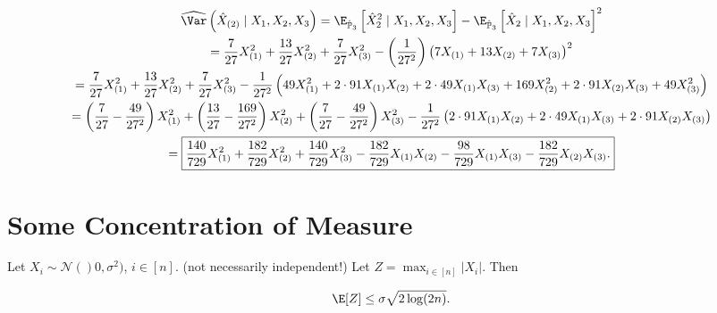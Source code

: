 \begin{solution}
\begin{enumerate}[(a)]
\begin{multline*}
\widehat{\Var} \left(\hat{X}_{(2)}  \mid X_1, X_2, X_3 \right)   = \E_{\hat{\mathbb{P}}_3} \left[ \hat{X}_2^2   \mid X_1, X_2, X_3 \right] - \E_{\hat{\mathbb{P}}_3} \left[ \hat{X}_2   \mid X_1, X_2, X_3 \right] ^2
\\ =  \frac{7}{27} X_{(1)}^2 + \frac{13}{27} X_{(2)}^2 + \frac{7}{27} X_{(3)}^2 - \left(\frac{1}{27^2} \right) \left( 7 X_{(1)} + 13 X_{(2)} +7 X_{(3)}\right)^2
\\ =  \frac{7}{27} X_{(1)}^2 + \frac{13}{27} X_{(2)}^2 + \frac{7}{27} X_{(3)}^2 - \frac{1}{27^2}  \left( 49 X_{(1)}^2 + 2 \cdot 91  X_{(1)}X_{(2)} + 2 \cdot 49 X_{(1)} X_{(3)}+ 169 X_{(2)}^2 +2 \cdot 91 X_{(2)} X_{(3)} + 49 X_{(3)}^2\right)
\\ =  \left( \frac{7}{27} - \frac{49}{27^2}  \right) X_{(1)}^2 + \left( \frac{13}{27} - \frac{169}{27^2} \right) X_{(2)}^2 + \left( \frac{7}{27} - \frac{49}{27^2} \right) X_{(3)}^2 - \frac{1}{27^2}  \left(  2 \cdot 91  X_{(1)}X_{(2)} + 2 \cdot 49 X_{(1)} X_{(3)} +2 \cdot 91 X_{(2)} X_{(3)} \right)
\\ = \boxed{ \frac{140}{729} X_{(1)}^2 + \frac{182}{729}  X_{(2)}^2 +  \frac{140}{729}X_{(3)}^2 - \frac{182}{729} X_{(1)}X_{(2)} - \frac{98}{729} X_{(1)} X_{(3)}    - \frac{182}{729} X_{(2)} X_{(3)}.}
\end{multline*}

\end{enumerate}

\end{solution}

\section{Some Concentration of Measure}

\begin{lemma}

Let \(X_i \sim \mathcal{N}()0, \sigma^2)\), \(i \in [n]\). (not necessarily independent!) Let \(Z = \max_{i \in [n]} |X_i|\). Then

\[
\E[Z] \leq \sigma \sqrt{2 \log(2n)}.
\]

\end{lemma}

